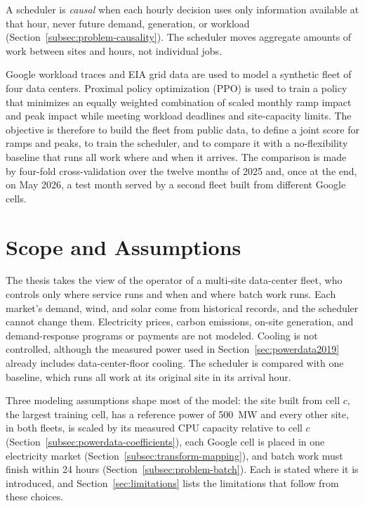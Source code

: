 \documentclass{UNCC-thesis}
\begin{document}
A scheduler is \emph{causal} when each hourly decision uses only information
available at that hour, never future demand, generation, or workload
(Section~\ref{subsec:problem-causality}). The scheduler moves aggregate
amounts of work between sites and hours, not individual jobs.

Google workload traces and EIA grid data are used to model a synthetic fleet
of four data centers. Proximal policy
optimization (PPO) is used to train a policy that minimizes an equally
weighted combination of scaled monthly ramp impact and peak impact
while meeting workload deadlines and site-capacity limits. The objective is
therefore to build the fleet from public data, to define a joint score for
ramps and peaks, to train the scheduler, and to compare it with a
no-flexibility baseline that runs all work where and when it arrives. The
comparison is made by four-fold cross-validation over the twelve months of
2025 and, once at the end, on May 2026, a test month served by a second fleet
built from different Google cells.

\section{Scope and Assumptions}
\label{sec:intro-scope}

The thesis takes the view of the operator of a multi-site data-center fleet,
who controls only where service runs and when and where batch work runs.
Each market's demand, wind, and solar come from historical records, and the
scheduler cannot change them. Electricity prices, carbon emissions, on-site
generation, and demand-response programs or payments are not modeled.
Cooling is not controlled, although the measured power used in
Section~\ref{sec:powerdata2019} already includes data-center-floor cooling.
The scheduler is compared with one baseline, which runs all work at its
original site in its arrival hour.

Three modeling assumptions shape most of the model: the site built from
cell \(c\), the largest training cell, has a reference power of 500~MW and
every other site, in both fleets, is scaled by its measured CPU capacity
relative to cell \(c\) (Section~\ref{subsec:powerdata-coefficients}), each
Google cell is placed in one electricity market
(Section~\ref{subsec:transform-mapping}), and batch work must finish within
24 hours (Section~\ref{subsec:problem-batch}). Each is stated where it is
introduced, and Section~\ref{sec:limitations} lists the limitations that
follow from these choices.
\end{document}
